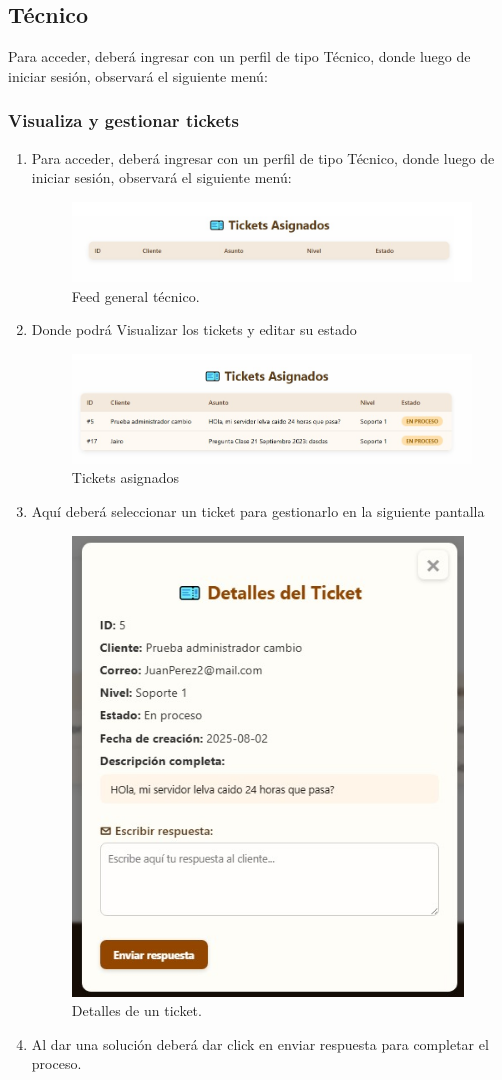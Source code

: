 \subsection{Técnico}
Para acceder, deberá ingresar con un perfil de tipo Técnico, donde luego de iniciar sesión, observará el siguiente menú:

\subsubsection*{Visualiza y gestionar tickets}

\begin{enumerate}
	\item Para acceder, deberá ingresar con un perfil de tipo Técnico, donde luego de iniciar sesión, observará el siguiente menú:
   	\begin{figure}[H]
    \centering
    \includegraphics[width=0.6\linewidth]{guiamodulo/tecnico-menu.png}
    \caption{Feed general técnico.}
    \label{fig:tecnico-menu}
    \end{figure}

    \item Donde podrá Visualizar los tickets y editar su estado
    \begin{figure}[H]
    \centering
    \includegraphics[width=0.6\linewidth]{guiamodulo/tecnico-proceso.png}
    \caption{Tickets asignados}
    \label{fig:tecnico-proceso}
    \end{figure}

    \item Aquí deberá seleccionar un ticket para gestionarlo en la siguiente pantalla
    \begin{figure}[H]
    \centering
    \includegraphics[width=0.3\linewidth]{guiamodulo/tecnico-detalle.png}
    \caption{Detalles de un ticket.}
    \label{fig:tecnico-detalle}
    \end{figure}

    \item Al dar una solución deberá dar click en enviar respuesta para completar el proceso.
\end{enumerate}

